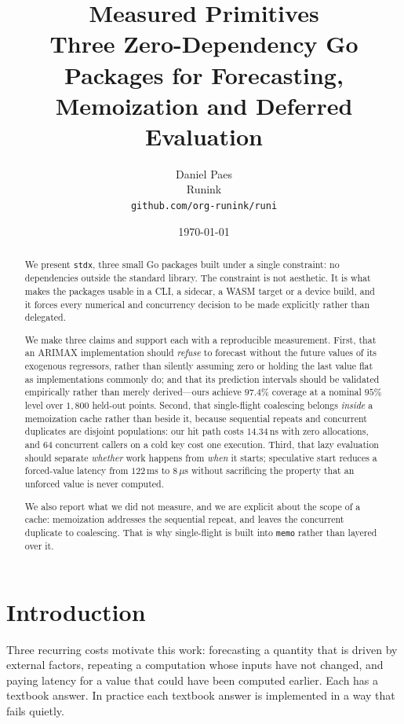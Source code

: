 \documentclass[10pt,twocolumn]{article}
\title{\textbf{Measured Primitives}\\[2pt]
\large Three Zero-Dependency Go Packages for Forecasting,\\Memoization and Deferred Evaluation}
\author{Daniel Paes\\\small Runink\\\small\texttt{github.com/org-runink/runi}}
\date{\today}
\begin{document}
\maketitle

\begin{abstract}
We present \texttt{stdx}, three small Go packages built under a single
constraint: no dependencies outside the standard library. The constraint is not
aesthetic. It is what makes the packages usable in a CLI, a sidecar, a WASM
target or a device build, and it forces every numerical and concurrency decision
to be made explicitly rather than delegated.

We make three claims and support each with a reproducible measurement. First,
that an ARIMAX implementation should \emph{refuse} to forecast without the future
values of its exogenous regressors, rather than silently assuming zero or holding
the last value flat as implementations commonly do; and that its prediction
intervals should be validated empirically rather than merely derived---ours
achieve $97.4\%$ coverage at a nominal $95\%$ level over $1{,}800$ held-out
points. Second, that single-flight coalescing belongs \emph{inside} a memoization
cache rather than beside it, because sequential repeats and concurrent duplicates
are disjoint populations: our hit path costs $14.34$\,ns with zero allocations,
and $64$ concurrent callers on a cold key cost one execution. Third, that lazy
evaluation should separate \emph{whether} work happens from \emph{when} it
starts; speculative start reduces a forced-value latency from $122$\,ms to
$8\,\mu$s without sacrificing the property that an unforced value is never
computed.

We also report what we did not measure, and we are explicit about the scope of a
cache: memoization addresses the sequential repeat, and leaves the concurrent
duplicate to coalescing. That is why single-flight is built into \texttt{memo}
rather than layered over it.
\end{abstract}

\section{Introduction}

Three recurring costs motivate this work: forecasting a quantity that is driven
by external factors, repeating a computation whose inputs have not changed, and
paying latency for a value that could have been computed earlier. Each has a
textbook answer. In practice each textbook answer is implemented in a way that
fails quietly.
\end{document}

